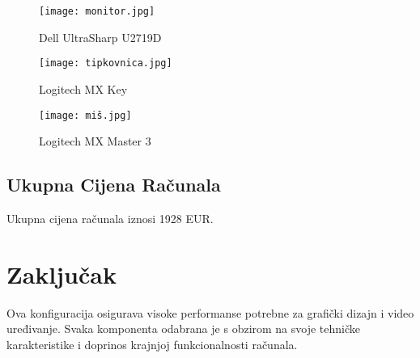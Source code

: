 \documentclass{article}
\begin{document}
\begin{itemize}
\begin{figure}[htbp]
  \centering
  \texttt{[image: monitor.jpg]}
  \caption{Dell UltraSharp U2719D}
\end{figure}

\begin{figure}[htbp]
  \centering
  \texttt{[image: tipkovnica.jpg]}
  \caption{Logitech MX Key}
\end{figure}

\begin{figure}[htbp]
  \centering
  \texttt{[image: miš.jpg]}
  \caption{Logitech MX Master 3}
\end{figure}

\end{itemize}

\subsection*{Ukupna Cijena Računala}
Ukupna cijena računala iznosi 1928 EUR.

\section*{Zaključak}
Ova konfiguracija osigurava visoke performanse potrebne za grafički dizajn i video uređivanje. Svaka komponenta odabrana je s obzirom na svoje tehničke karakteristike i doprinos krajnjoj funkcionalnosti računala.
\end{document}

